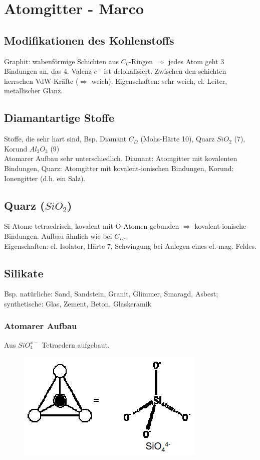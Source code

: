 \section{Atomgitter - Marco}

\subsection{Modifikationen des Kohlenstoffs}
Graphit: wabenförmige Schichten aus $C_6$-Ringen $\Rightarrow$ jedes Atom geht 3 Bindungen an, das 4. Valenz-$e^-$ ist delokalisiert. Zwischen den schichten herrschen VdW-Kräfte ($\Rightarrow$ weich). Eigenschaften: sehr weich, el. Leiter, metallischer Glanz.

\subsection{Diamantartige Stoffe}
Stoffe, die sehr hart sind, Bsp. Diamant $C_D$ (Mohs-Härte 10), Quarz $SiO_2$ (7), Korund $Al_2O_3$ (9) \\

Atomarer Aufbau sehr unterschiedlich. Diamant: Atomgitter mit kovalenten Bindungen, Quarz: Atomgitter mit kovalent-ionischen Bindungen, Korund: Ionengitter (d.h. ein Salz).

\subsection{Quarz ($SiO_2$)}
Si-Atome tetraedrisch, kovalent mit O-Atomen gebunden $\Rightarrow$ kovalent-ionische Bindungen. Aufbau ähnlich wie bei $C_D$. \\

Eigenschaften: el. Isolator, Härte 7, Schwingung bei Anlegen eines el.-mag. Feldes. \\

\subsection{Silikate}
Bsp. natürliche: Sand, Sandstein, Granit, Glimmer, Smaragd, Asbest; synthetische: Glas, Zement, Beton, Glaskeramik \\

\subsubsection{Atomarer Aufbau}
Aus $SiO_4^{x-}$ Tetraedern aufgebaut. \\

\begin{figure}[htbp]
	\centering
	\includegraphics[width=0.4\linewidth]{images/8_SiO4.png}
\end{figure}

